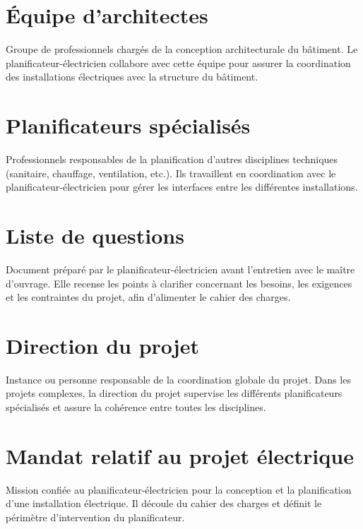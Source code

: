 \documentclass[a4paper,12pt,answers,addpoints]{exam}
\begin{document}
\begin{questions}
\begin{parts}
			\part[1]{Équipe d'architectes}
			\begin{solution}
				Groupe de professionnels chargés de la conception architecturale du bâtiment. Le planificateur-électricien collabore avec cette équipe pour assurer la coordination des installations électriques avec la structure du bâtiment.
			\end{solution}
			
			\part[1]{Planificateurs spécialisés}
			\begin{solution}
				Professionnels responsables de la planification d'autres disciplines techniques (sanitaire, chauffage, ventilation, etc.). Ils travaillent en coordination avec le planificateur-électricien pour gérer les interfaces entre les différentes installations.
			\end{solution}
			
			\part[1]{Liste de questions}
			\begin{solution}
				Document préparé par le planificateur-électricien avant l'entretien avec le maître d'ouvrage. Elle recense les points à clarifier concernant les besoins, les exigences et les contraintes du projet, afin d'alimenter le cahier des charges.
			\end{solution}
			
			\part[1]{Direction du projet}
			\begin{solution}
				Instance ou personne responsable de la coordination globale du projet. Dans les projets complexes, la direction du projet supervise les différents planificateurs spécialisés et assure la cohérence entre toutes les disciplines.
			\end{solution}
			
			\part[1]{Mandat relatif au projet électrique}
			\begin{solution}
				Mission confiée au planificateur-électricien pour la conception et la planification d'une installation électrique. Il découle du cahier des charges et définit le périmètre d'intervention du planificateur.
			\end{solution}
			

\end{parts}
\end{questions}
\end{document}
